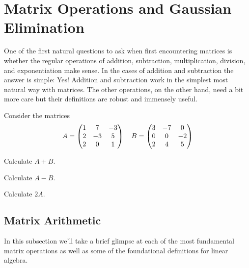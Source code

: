 \section{Matrix Operations and Gaussian Elimination} \label{S:10.2.MatrixAlgebra}
One of the first natural questions to ask when first encountering matrices is whether the
regular operations of addition, subtraction, multiplication, division, and exponentiation
make sense.  In the cases of addition and subtraction the answer is simple: Yes!  Addition
and subtraction work in the simplest most natural way with matrices.  The other operations,
on the other hand, need a bit more care but their definitions are robust and immensely
useful.


% 
\begin{problem}
Consider the matrices 
\[ A = \begin{pmatrix} 1 & 7 & -3 \\ 2 & -3 & 5 \\ 2 & 0 & 1 \end{pmatrix} \quad B = \begin{pmatrix} 3 & -7 & 0 \\ 0 & 0
    & -2 \\ 2 & 4 & 5 \end{pmatrix} \]
\ba
    \item Calculate $A+B$.
    \item Calculate $A-B$.
    \item Calculate $2A$.
\ea
\end{problem}

\subsection*{Matrix Arithmetic}
In this subsection we'll take a brief glimpse at each of the most fundamental matrix
operations as well as some of the foundational definitions for linear algebra.

